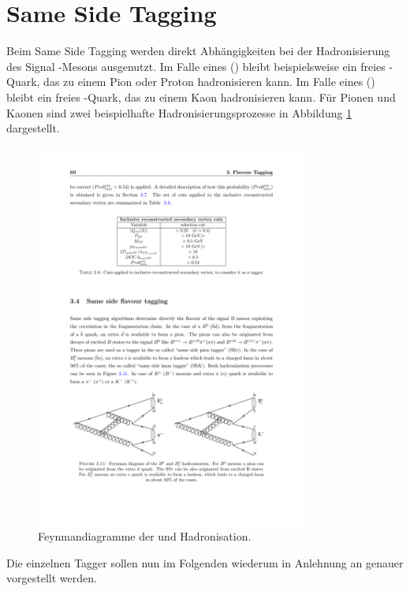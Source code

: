 \section{Same Side Tagging}

Beim Same Side Tagging werden direkt Abhängigkeiten bei der Hadronisierung des Signal \B-Mesons ausgenutzt. Im Falle eines \Bz (\bquarkbar\dquark) bleibt beispielsweise ein freies \dquarkbar-Quark, das zu einem Pion oder Proton hadronisieren kann. Im Falle eines \Bs (\bquarkbar\squark) bleibt ein freies \squarkbar-Quark, das zu einem Kaon hadronisieren kann. Für Pionen und Kaonen sind zwei beispielhafte Hadronisierungsprozesse in Abbildung \ref{fig:FThadronisierung} dargestellt.
\begin{figure}[htpb]
	\centering
		\includegraphics[width=0.8\textwidth]{fig/FThadronisierung.pdf}
	\caption{Feynmandiagramme der \Bz und \Bs Hadronisation. \cite{tagging}}
	\label{fig:FThadronisierung} 
\end{figure} 
Die einzelnen Tagger sollen nun im Folgenden wiederum in Anlehnung an \cite{tagging} genauer vorgestellt werden.
